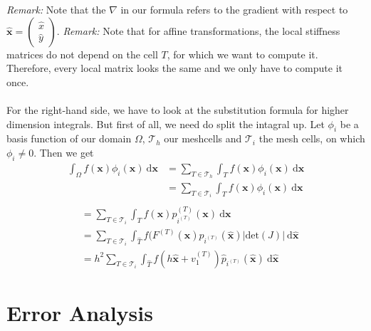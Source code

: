 \documentclass[a4paper,12pt]{article}
\begin{document}
\textit{Remark:} Note that the $\nabla$ in our formula refers to the gradient with respect to $\bm{\hat x}=\begin{pmatrix} \hat x \\ \hat y\end{pmatrix}$.
\textit{Remark:} Note that for affine transformations, the local stiffness matrices do not depend on the cell $T$, for which we want to compute it. Therefore, every local matrix looks the same and we only have to compute it once.
\\ \\
For the right-hand side, we have to look at the substitution formula for higher dimension integrals. But first of all, we need do split the intagral up. Let $\phi_i$ be a basis function of our domain $\Omega$, $\mathscr{T}_h$ our meshcells and $\mathscr{T}_i$ the mesh cells, on which $\phi_i \neq 0$. Then we get
\begin{align*}
\int_{\Omega}f(\bm{x})\phi_i(\bm{x})\ \mbox{d}\bm{x}&=\sum_{T\in\mathscr{T}_h} \int_Tf(\bm{x})\phi_i(\bm{x})\ \mbox{d}\bm{x} \\
													&=\sum_{T\in\mathscr{T}_i} \int_Tf(\bm{x})\phi_i(\bm{x})\ \mbox{d}\bm{x} \\
\end{align*}
\begin{align*}
													&=\sum_{T\in\mathscr{T}_i} \int_Tf(\bm{x})p^{(T)}_{i^{(T)}}(\bm{x})\ \mbox{d}\bm{x} \\
													&=\sum_{T\in\mathscr{T}_i} \int_{\hat T}f(F^{(T)}(\bm{\hat x})\hat p_{i^{(T)}}(\bm{\hat x})|\mbox{det}(J)|\ \mbox{d}\bm{\hat x} \\
													&=h^2\sum_{T\in\mathscr{T}_i} \int_{\hat T}f(h\bm{\hat x}+v^{(T)}_1)\hat p_{i^{(T)}}(\bm{\hat x})\ \mbox{d}\bm{\hat x}						
\end{align*}

\section{Error Analysis}
\end{document}
